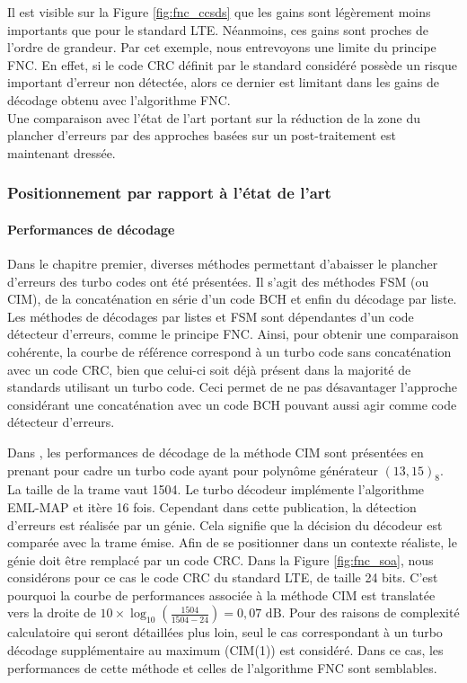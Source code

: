 Il est visible sur la Figure \ref{fig:fnc_ccsds} que les gains sont légèrement moins importants que pour le standard LTE. 
Néanmoins, ces gains sont proches de l'ordre de grandeur.
Par cet exemple, nous entrevoyons une limite du principe FNC. En effet, si le code CRC définit par le standard considéré 
possède un risque important d'erreur non détectée, alors ce dernier est limitant dans les gains de décodage obtenu
avec l'algorithme FNC. \\
Une comparaison avec l'état de l'art portant sur la réduction de la zone du plancher d'erreurs 
par des approches basées sur un post-traitement est maintenant dressée.

\subsubsection{Positionnement par rapport à l'état de l'art}
\paragraph*{Performances de décodage}
Dans le chapitre premier, diverses méthodes permettant d'abaisser le plancher d'erreurs des turbo codes ont été présentées.
Il s'agit des méthodes FSM (ou CIM), de la concaténation en série d'un code BCH et enfin du décodage par liste. 
Les méthodes de décodages par listes et FSM sont dépendantes d'un code détecteur d'erreurs, comme le principe FNC. Ainsi, 
pour obtenir une comparaison cohérente, la courbe de référence correspond à un turbo code 
sans concaténation avec un code CRC, bien que celui-ci soit déjà présent dans la majorité de standards utilisant un turbo code. 
Ceci permet de ne pas désavantager l'approche considérant une concaténation avec un code BCH pouvant aussi agir comme 
code détecteur d'erreurs.

Dans \cite{cim}, les performances de décodage de la méthode CIM sont présentées en prenant pour cadre un turbo code ayant pour
polynôme générateur $(13,15)_8$. La taille de la trame vaut 1504. Le turbo décodeur implémente l'algorithme EML-MAP et
itère 16 fois. Cependant dans cette publication, la détection d'erreurs est réalisée par un génie. Cela signifie
que la décision du décodeur est comparée avec la trame émise. Afin de se positionner dans un contexte réaliste, le génie doit être remplacé
par un code CRC. Dans la Figure \ref{fig:fnc_soa}, nous considérons pour ce cas le code CRC du standard LTE, de taille 24 bits.
C'est pourquoi la courbe de performances associée à la méthode CIM est translatée vers la droite de $10\times\log_{10}\left(\frac{1504}{1504-24}\right)=0,07\text{ dB}$.
Pour des raisons de complexité calculatoire qui seront détaillées plus loin, seul le cas correspondant à un 
turbo décodage supplémentaire au maximum (CIM(1)) est considéré. Dans ce cas, les performances de cette méthode et celles de l'algorithme
FNC sont semblables.

